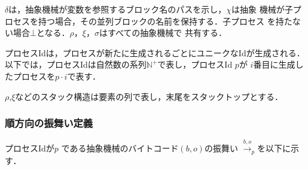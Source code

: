 \documentclass[submit,PRO]{ipsj}
\begin{document}
$\delta$は，抽象機械が変数を参照するブロック名のパスを示し，$\chi$は抽象
機械が子プロセスを持つ場合，その並列ブロックの名前を保持する．子プロセス
を持たない場合$\bot$となる．$\rho$，$\xi$，$\sigma$はすべての抽象機械で
共有する．

プロセスIdは，プロセスが新たに生成されるごとにユニークなIdが生成される．
以下では，プロセスIdは自然数の系列$\mathbb{N}^+$で表し，プロセスId $p$が
$i$番目に生成したプロセスを$p\cdot i$で表す．

$\rho$,$\xi$などのスタック構造は要素の列で表し，末尾をスタックトップとする．

\subsubsection{順方向の振舞い定義}

プロセスIdが$p$ である抽象機械のバイトコード$(b,o)$の振舞い
$\xrightarrow{b,o}_{p}$を以下に示す．
\end{document}
